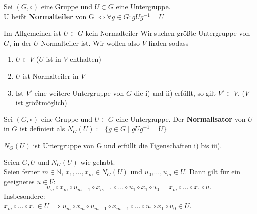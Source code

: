 \documentclass[a4paper]{article}
\newcommand{\N}{\mathbb{N}}
\begin{document}
\thispagestyle{ErsteSeite} 
\begin{center}
\end{center}
\hspace{10mm}
\begin{definition}[1.1]
        Sei $(G, \circ)$ eine Gruppe und $U \subset G$ eine Untergruppe. \\
        U heißt \textbf{Normalteiler} von G $\iff \forall g \in G: g U g^{-1} = U $
\end{definition}

\begin{bemerkung}
Im Allgemeinen ist $U \subset G$ kein Normalteiler Wir suchen größte Untergruppe von $G$, in der $U$ Normalteiler ist. Wir wollen also $V$ finden sodass
\begin{enumerate}
        \item $U \subset V$ ($U$ ist in $V$ enthalten)
        \item $U$ ist Normalteiler in $V$
        \item Ist $V'$ eine weitere Untergruppe von $G$ die i) und ii) erfüllt, so gilt $V' \subset V$. ($V$ ist größtmöglich)
    \end{enumerate}
\end{bemerkung}

\begin{definition}[2.2]
        Sei $(G, \circ)$ eine Gruppe und $U \subset G$ eine Untergruppe. Der \textbf{Normalisator} von $U$ in $G$ ist definiert als 
          $N_G(U) := \{g \in G  \mid g U g^{-1} = U\}$
\end{definition}
\begin{satz}[2.3]
        $N_G(U)$ ist Untergruppe von G und erfüllt die Eigenschaften i) bis iii).
    \end{satz}

\begin{satz}[2.4]
        Seien $G, U$ und $N_G(U)$ wie gehabt. \\
        Seien ferner $m \in \N$, $x_1, \ldots, x_m \in N_G(U)$ und $u_0, \ldots, u_m \in U$. Dann gilt für ein geeignetes $u \in U$:
        \[
            u_m \circ x_m \circ u_{m-1} \circ x_{m-1} \circ \ldots \circ u_1 \circ x_1 \circ u_0 = x_m \circ \ldots \circ  x_1 \circ u
        .\] 
        Insbesondere: \\
        $x_m \circ \ldots \circ x_1 \in U \implies u_m \circ x_m \circ u_{m-1} \circ x_{m-1} \circ \ldots \circ u_1 \circ x_1 \circ u_0 \in U$.
    \end{satz}
    
\end{document}
